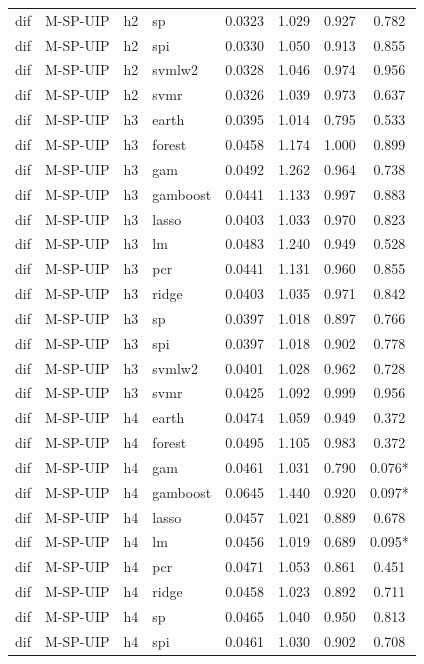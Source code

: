 \begin{ThreePartTable}
\begin{longtable}[t]{llclcccc}
dif & M-SP-UIP & h2 & sp & 0.0323 & 1.029 & 0.927 & 0.782\\
dif & M-SP-UIP & h2 & spi & 0.0330 & 1.050 & 0.913 & 0.855\\
dif & M-SP-UIP & h2 & svmlw2 & 0.0328 & 1.046 & 0.974 & 0.956\\
dif & M-SP-UIP & h2 & svmr & 0.0326 & 1.039 & 0.973 & 0.637\\
\addlinespace
dif & M-SP-UIP & h3 & earth & 0.0395 & 1.014 & 0.795 & 0.533\\
dif & M-SP-UIP & h3 & forest & 0.0458 & 1.174 & 1.000 & 0.899\\
dif & M-SP-UIP & h3 & gam & 0.0492 & 1.262 & 0.964 & 0.738\\
dif & M-SP-UIP & h3 & gamboost & 0.0441 & 1.133 & 0.997 & 0.883\\
dif & M-SP-UIP & h3 & lasso & 0.0403 & 1.033 & 0.970 & 0.823\\
dif & M-SP-UIP & h3 & lm & 0.0483 & 1.240 & 0.949 & 0.528\\
dif & M-SP-UIP & h3 & pcr & 0.0441 & 1.131 & 0.960 & 0.855\\
dif & M-SP-UIP & h3 & ridge & 0.0403 & 1.035 & 0.971 & 0.842\\
dif & M-SP-UIP & h3 & sp & 0.0397 & 1.018 & 0.897 & 0.766\\
dif & M-SP-UIP & h3 & spi & 0.0397 & 1.018 & 0.902 & 0.778\\
dif & M-SP-UIP & h3 & svmlw2 & 0.0401 & 1.028 & 0.962 & 0.728\\
dif & M-SP-UIP & h3 & svmr & 0.0425 & 1.092 & 0.999 & 0.956\\
\addlinespace
dif & M-SP-UIP & h4 & earth & 0.0474 & 1.059 & 0.949 & 0.372\\
dif & M-SP-UIP & h4 & forest & 0.0495 & 1.105 & 0.983 & 0.372\\
dif & M-SP-UIP & h4 & gam & 0.0461 & 1.031 & 0.790 & 0.076*\\
dif & M-SP-UIP & h4 & gamboost & 0.0645 & 1.440 & 0.920 & 0.097*\\
dif & M-SP-UIP & h4 & lasso & 0.0457 & 1.021 & 0.889 & 0.678\\
dif & M-SP-UIP & h4 & lm & 0.0456 & 1.019 & 0.689 & 0.095*\\
dif & M-SP-UIP & h4 & pcr & 0.0471 & 1.053 & 0.861 & 0.451\\
dif & M-SP-UIP & h4 & ridge & 0.0458 & 1.023 & 0.892 & 0.711\\
dif & M-SP-UIP & h4 & sp & 0.0465 & 1.040 & 0.950 & 0.813\\
dif & M-SP-UIP & h4 & spi & 0.0461 & 1.030 & 0.902 & 0.708\\

\end{longtable}
\end{ThreePartTable}
